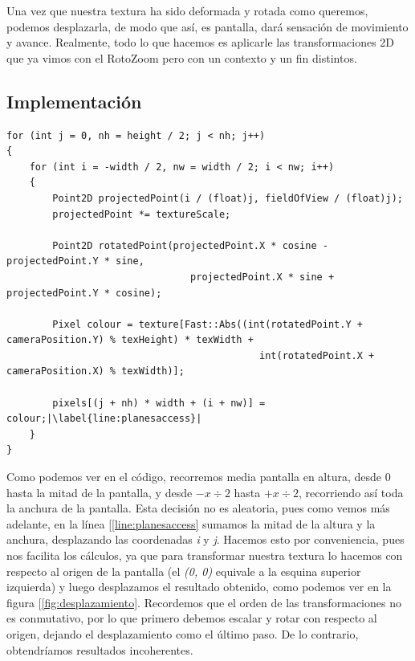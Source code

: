 Una vez que nuestra textura ha sido deformada y rotada como queremos, podemos desplazarla, de modo que así, es pantalla, dará sensación de movimiento y avance. Realmente, todo lo que hacemos es aplicarle las transformaciones 2D que ya vimos con el RotoZoom pero con un contexto y un fin distintos.

\subsection{Implementación}

\begin{lstlisting}[style=C-color, caption={Código para generar un efecto básico de planos infinitos, con escalado, rotación y translación}, label=cod:infiniteplanes, escapechar=|]
for (int j = 0, nh = height / 2; j < nh; j++)
{
    for (int i = -width / 2, nw = width / 2; i < nw; i++)
    {
        Point2D projectedPoint(i / (float)j, fieldOfView / (float)j);
        projectedPoint *= textureScale;
        
        Point2D rotatedPoint(projectedPoint.X * cosine - projectedPoint.Y * sine,
                                projectedPoint.X * sine + projectedPoint.Y * cosine);
                             
        Pixel colour = texture[Fast::Abs((int(rotatedPoint.Y + cameraPosition.Y) % texHeight) * texWidth +
                                            int(rotatedPoint.X + cameraPosition.X) % texWidth)];
                                         
        pixels[(j + nh) * width + (i + nw)] = colour;|\label{line:planesaccess}|
    }
}
\end{lstlisting}

Como podemos ver en el código, recorremos media pantalla en altura, desde 0 hasta la mitad de la pantalla, y desde \(-x \div 2\) hasta \(+x \div 2\), recorriendo así toda la anchura de la pantalla. Esta decisión no es aleatoria, pues como vemos más adelante, en la línea [\ref{line:planesaccess} sumamos la mitad de la altura y la anchura, desplazando las coordenadas \emph{i} y \emph{j}. Hacemos esto por conveniencia, pues nos facilita los cálculos, ya que para transformar nuestra textura lo hacemos con respecto al origen de la pantalla (el \emph{(0, 0)} equivale a la esquina superior izquierda) y luego desplazamos el resultado obtenido, como podemos ver en la figura [\ref{fig:desplazamiento}. Recordemos que el orden de las transformaciones no es conmutativo, por lo que primero debemos escalar y rotar con respecto al origen, dejando el desplazamiento como el último paso. De lo contrario, obtendríamos resultados incoherentes.\\

